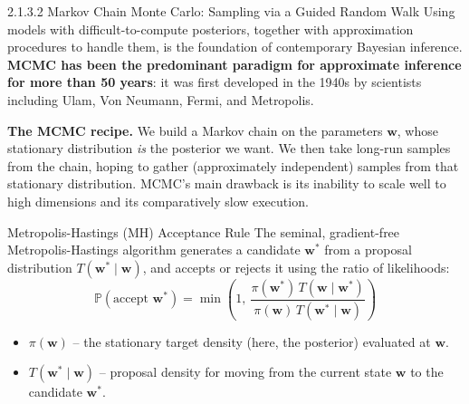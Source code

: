 \documentclass[aspectratio=169,10pt]{beamer}
\begin{document}
\begin{frame}[allowframebreaks]{2.1.3.2 Markov Chain Monte Carlo: Sampling via a Guided Random Walk}
  Using models with difficult-to-compute posteriors, together with
  approximation procedures to handle them, is the foundation of contemporary
  Bayesian inference. \textbf{MCMC has been the predominant paradigm for
  approximate inference for more than 50 years}: it was first developed in
  the 1940s by scientists including Ulam, Von Neumann, Fermi, and Metropolis.

  \textbf{The MCMC recipe.} We build a Markov chain on the parameters
  $\mathbf{w}$, whose stationary distribution \emph{is} the posterior we
  want. We then take long-run samples from the chain, hoping to gather
  (approximately independent) samples from that stationary distribution.
  MCMC's main drawback is its inability to scale well to high dimensions and
  its comparatively slow execution.

  \framebreak

  \begin{block}{Metropolis-Hastings (MH) Acceptance Rule}
    The seminal, gradient-free Metropolis-Hastings algorithm generates a
    candidate $\mathbf{w}^*$ from a proposal distribution
    $T(\mathbf{w}^*\mid \mathbf{w})$, and accepts or rejects it using the
    ratio of likelihoods:
    \[
      \mathbb{P}(\text{accept } \mathbf{w}^*) =
      \min\left(1,\ \frac{\pi(\mathbf{w}^*)\,T(\mathbf{w}\mid \mathbf{w}^*)}
                          {\pi(\mathbf{w})\,T(\mathbf{w}^*\mid \mathbf{w})}\right)
      \tag{2.4}
    \]
    \begin{itemize}
      \item $\pi(\mathbf{w})$ -- the stationary target density (here, the
        posterior) evaluated at $\mathbf{w}$.
      \item $T(\mathbf{w}^*\mid \mathbf{w})$ -- proposal density for
        moving from the current state $\mathbf{w}$ to the candidate
        $\mathbf{w}^*$.
    \end{itemize}
  \end{block}

  \framebreak


\end{frame}
\end{document}
